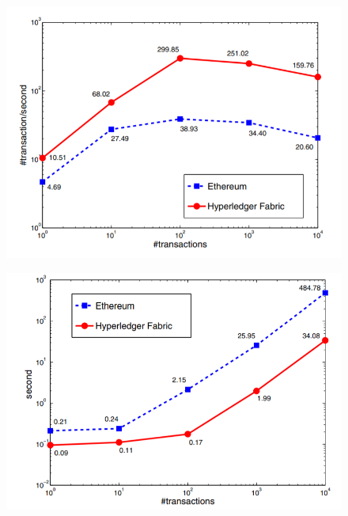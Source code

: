 \documentclass{VUMIFPSkursinis}
\begin{document}
\begin{figure}
\centering
\begin{minipage}{.5\textwidth}
  \centering
  \includegraphics[width=1\linewidth]{img/TwoPraeinamumas}
  \label{fig:test1}
\end{minipage}%
\begin{minipage}{.5\textwidth}
  \centering
  \includegraphics[width=1\linewidth]{img/TwoVelavimas}
  \label{fig:test2}
\end{minipage}

\end{figure}
\end{document}
